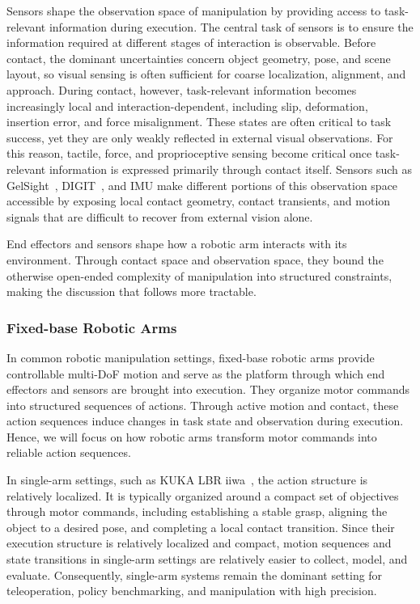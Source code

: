 \documentclass[acmsmall,screen,review]{acmart}
\begin{document}
Sensors shape the observation space of manipulation by providing access to task-relevant information during execution.
The central task of sensors is to ensure the information required at different stages of interaction is observable.
Before contact, the dominant uncertainties concern object geometry, pose, and scene layout, so visual sensing is often sufficient for coarse localization, alignment, and approach. 
During contact, however, task-relevant information becomes increasingly local and interaction-dependent, including slip, deformation, insertion error, and force misalignment. 
These states are often critical to task success, yet they are only weakly reflected in external visual observations. 
For this reason, tactile, force, and proprioceptive sensing become critical once task-relevant information is expressed primarily through contact itself. 
Sensors such as GelSight~\cite{yuan2017gelsight}, DIGIT~\cite{mike2020digit}, and IMU make different portions of this observation space accessible by exposing local contact geometry, contact transients, and motion signals that are difficult to recover from external vision alone.

End effectors and sensors shape how a robotic arm interacts with its environment. 
Through contact space and observation space, they bound the otherwise open-ended complexity of manipulation into structured constraints, making the discussion that follows more tractable.

\subsubsection{Fixed-base Robotic Arms}\label{subsec:manipulators}

In common robotic manipulation settings, fixed-base robotic arms provide controllable multi-DoF motion and serve as the platform through which end effectors and sensors are brought into execution.
They organize motor commands into structured sequences of actions. 
Through active motion and contact, these action sequences induce changes in task state and observation during execution.
Hence, we will focus on how robotic arms transform motor commands into reliable action sequences.

In single-arm settings, such as KUKA LBR iiwa~\cite{mokaram2017rosiiwa}, the action structure is relatively localized. 
It is typically organized around a compact set of objectives through motor commands, including establishing a stable grasp, aligning the object to a desired pose, and completing a local contact transition.
Since their execution structure is relatively localized and compact, motion sequences and state transitions in single-arm settings are relatively easier to collect, model, and evaluate. 
Consequently, single-arm systems remain the dominant setting for teleoperation, policy benchmarking, and manipulation with high precision.
\end{document}
